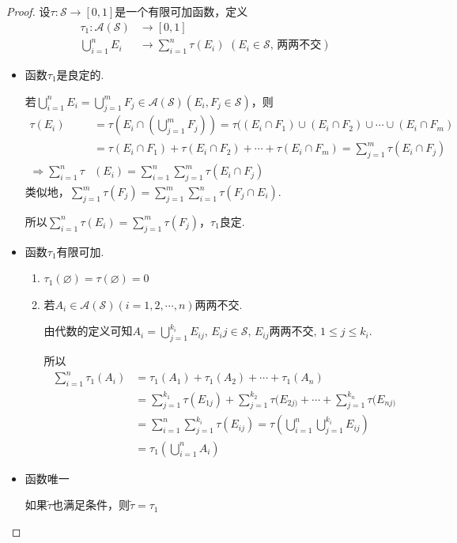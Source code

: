 \documentclass[lang=cn,a4paper,11pt,openany,scheme=chinese,twoside]{elegantbook}
\newcommand{\setjot}[1][0]{\setlength{\jot}{#1 pt}}
\begin{document}
\begin{proof}
    设$\tau:\mathcal{S}\to[0,1]$是一个有限可加函数，定义
    {\setlength{\jot}{-5pt}\begin{align*}
        \tau_1:\mathcal{A}(\mathcal{S})&\to[0,1]\\
        \bigcup_{i=1}^n{E_i}&\to\sum_{i=1}^n{\tau(E_i)}\,\,(E_i\in\mathcal{S},\,\text{两两不交})
    \end{align*}}
    \begin{itemize}
        \item 函数$\tau_1$是良定的.\par
        若$\bigcup_{i=1}^n{E_i}=\bigcup_{j=1}^m{F_j}\in\mathcal{A}(\mathcal{S})(E_i,F_j\in\mathcal{S})$，则
        {\setjot[-5]\begin{align*}
            \tau(E_i)&=\tau\left(E_i\cap\left(\bigcup_{j=1}^m{F_j}\right)\right)=\tau((E_i\cap F_1)\cup(E_i\cap F_2) \cup \cdots\cup(E_i\cap F_m) \\
            &=\tau(E_i\cap F_1)+\tau(E_i\cap F_2)+\cdots+\tau(E_i\cap F_m)=\sum_{j=1}^m\tau(E_i\cap F_j) \\
            \Rightarrow\sum_{i=1}^n\tau&(E_i)=\sum_{i=1}^n\sum_{j=1}^m{\tau(E_i\cap F_j)}
        \end{align*}}
        类似地，$\sum_{j=1}^m{\tau(F_j)}=\sum_{j=1}^m\sum_{i=1}^n{\tau(F_j\cap E_i)}$.\par
        所以$\sum_{i=1}^n{\tau(E_i)}=\sum_{j=1}^m{\tau(F_j)}$，$\tau_1$良定.
        \item 函数$\tau_1$有限可加.\par
        \begin{enumerate}[(1)]
            \item $\tau_1(\varnothing)=\tau(\varnothing)=0$
            \item 若$A_i\in\mathcal{A}(\mathcal{S})(i=1,2,\cdots,n)$两两不交.\par
            由代数的定义可知$A_i=\bigcup_{j=1}^{k_i}{E_{ij}},\,E_ij\in\mathcal{S},\,E_{ij}\text{两两不交},\, 1\leqslant j\leqslant k_i$.\par
            所以
            \vspace{-1em}
            {\setjot[-5]\begin{align*}
                \sum_{i=1}^n{\tau_1(A_i)}&=\tau_1(A_1)+\tau_1(A_2)+\cdots+\tau_1(A_n)\\
                &=\sum_{j=1}^{k_1}{\tau(E_{1j})}+\sum_{j=1}^{k_2}{\tau(E_{2j)}}+\cdots+\sum_{j=1}^{k_n}{\tau(E_{nj)}}\\
                &=\sum_{i=1}^n\sum_{j=1}^{k_i}{\tau(E_{ij})}=\tau\left(\bigcup_{i=1}^n\bigcup_{j=1}^{k_i}{E_{ij}}\right)\\
                &=\tau_1\left(\bigcup_{i=1}^n{A_i}\right)
            \end{align*}}
        \end{enumerate}
        \item 函数唯一\par
        如果$\tilde{\tau}$也满足条件，则$\tilde{\tau}=\tau_1$
    \end{itemize}
\end{proof}
\end{document}
